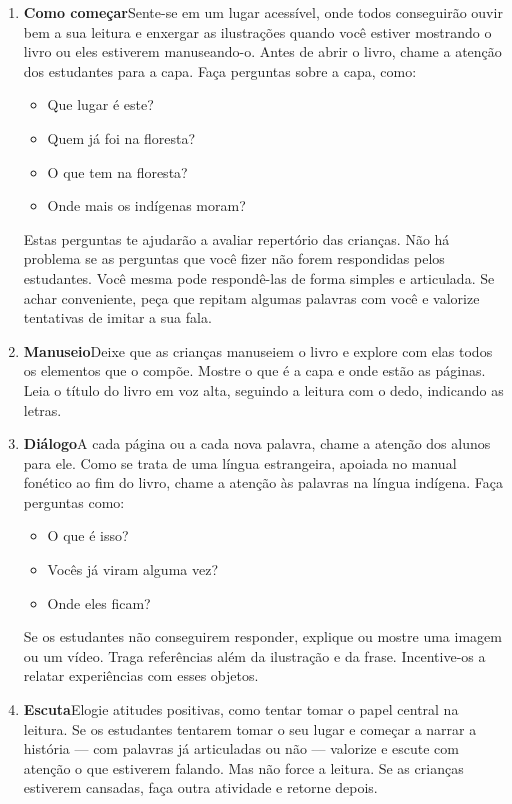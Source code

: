 \documentclass[11pt]{extarticle}
\begin{document}
\begin{enumerate}
\item \textbf{Como começar}\quad Sente-se em um lugar acessível, 
onde todos conseguirão ouvir bem a sua leitura e enxergar as ilustrações 
quando você estiver mostrando o livro ou eles estiverem manuseando-o. 
Antes de abrir o livro, chame a atenção dos estudantes para a capa. 
Faça perguntas sobre a capa, como: 

\begin{itemize}
\item Que lugar é este?
\item Quem já foi na floresta?
\item O que tem na floresta?
\item Onde mais os indígenas moram?
\end{itemize}

Estas perguntas te ajudarão a avaliar repertório das crianças. 
Não há problema se as perguntas que você fizer não forem respondidas pelos 
estudantes. Você mesma pode respondê-las de forma simples e articulada. Se achar 
conveniente, peça que repitam algumas palavras com você e valorize tentativas 
de imitar a sua fala. 
 
\item \textbf{Manuseio}\quad Deixe que as crianças manuseiem o livro 
e explore com elas todos os elementos que o compõe. Mostre o que é a 
capa e onde estão as páginas. Leia o título do livro em voz alta, seguindo 
a leitura com o dedo, indicando as letras. 

\item \textbf{Diálogo}\quad A cada página ou a cada nova palavra,
chame a atenção dos alunos para ele. Como se trata de uma língua estrangeira, 
apoiada no manual fonético ao fim do livro, chame a atenção às palavras na língua 
indígena. Faça perguntas como:

\begin{itemize}
\item O que é isso?
\item Vocês já viram alguma vez? 
\item Onde eles ficam? 
\end{itemize}

Se os estudantes não conseguirem responder, explique ou mostre uma 
imagem ou um vídeo. Traga referências além da ilustração e da frase. 
Incentive-os a relatar experiências com esses objetos.

\item \textbf{Escuta}\quad Elogie atitudes positivas, como 
tentar tomar o papel central na leitura. Se os estudantes tentarem 
tomar o seu lugar e começar a narrar a história --- com palavras já articuladas 
ou não --- valorize e escute com atenção o que estiverem falando. Mas não 
force a leitura. Se as crianças estiverem cansadas, faça outra atividade 
e retorne depois. 


\end{enumerate}
\end{document}
